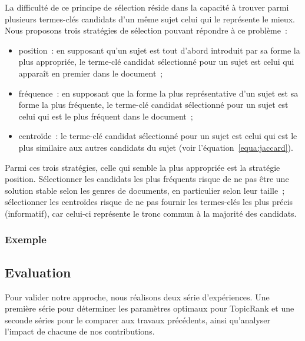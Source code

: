         La difficulté de ce principe de sélection réside dans la capacité à
        trouver parmi plusieurs termes-clés candidats d'un même sujet celui qui
        le représente le mieux. Nous proposons trois stratégies de sélection
        pouvant répondre à ce problème~:
        \begin{itemize}
          \item{position~: en supposant qu'un sujet est tout d'abord
                introduit par sa forme la plus appropriée, le terme-clé
                candidat sélectionné pour un sujet est celui qui apparaît en
                premier dans le document~;}
          \item{fréquence~: en supposant que la forme la plus représentative
                d'un sujet est sa forme la plus fréquente, le terme-clé candidat
                sélectionné pour un sujet est celui qui est le plus fréquent
                dans le document~;}
          \item{centroïde~: le terme-clé candidat sélectionné pour un sujet
                est celui qui est le plus similaire aux autres candidats du
                sujet (voir l'équation~\ref{equa:jaccard}).}
        \end{itemize}
        Parmi ces trois stratégies, celle qui semble la plus appropriée est la
        stratégie position. Sélectionner les candidats les plus fréquents risque
        de ne pas être une solution stable selon les genres de documents, en
        particulier selon leur taille~; sélectionner les centroïdes risque de ne
        pas fournir les termes-clés les plus précis (informatif), car celui-ci
        représente le tronc commun à la majorité des candidats.

      \subsubsection{Exemple}
      \label{subsubsec:main-automatic_keyphrase_annotation-unsupervised_automatic_keyphrase_extraction-topicrank-example}

    \subsection{Evaluation}
    \label{subsec:main-automatic_keyphrase_annotation-unsupervised_automatic_keyphrase_extraction-evaluation}
      Pour valider notre approche, nous réalisons deux série d'expériences. Une
      première série pour déterminer les paramètres optimaux pour TopicRank et
      une seconde séries pour le comparer aux travaux précédents, ainsi
      qu'analyser l'impact de chacune de nos contributions.
      
